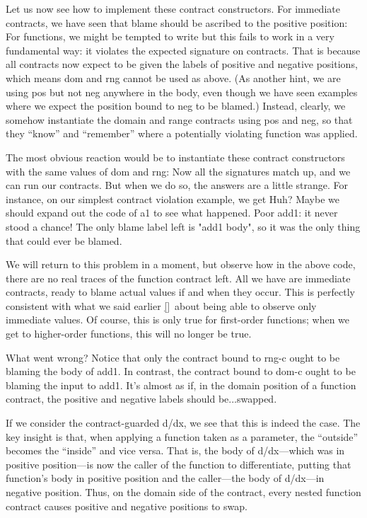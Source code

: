 Let us now see how to implement these contract constructors. For immediate
contracts, we have seen that blame should be ascribed to the positive position:
For functions, we might be tempted to write
but this fails to work in a very fundamental way: it violates the expected
signature on contracts. That is because all contracts now expect to be given the
labels of positive and negative positions, which means dom and rng cannot be
used as above. (As another hint, we are using pos but not neg anywhere in the
body, even though we have seen examples where we expect the position bound to
neg to be blamed.) Instead, clearly, we somehow instantiate the domain and range
contracts using pos and neg, so that they “know” and “remember” where a
potentially violating function was applied.

The most obvious reaction would be to instantiate these contract constructors
with the same values of dom and rng:
Now all the signatures match up, and we can run our contracts. But when we do
so, the answers are a little strange. For instance, on our simplest contract
violation example, we get
Huh? Maybe we should expand out the code of a1 to see what happened.
Poor add1: it never stood a chance! The only blame label left is "add1 body", so
it was the only thing that could ever be blamed.

We will return to this problem in a moment, but observe how in the above code,
there are no real traces of the function contract left. All we have are
immediate contracts, ready to blame actual values if and when they occur. This
is perfectly consistent with what we said earlier \ref{}\ about being able to
observe only immediate values. Of course, this is only true for first-order
functions; when we get to higher-order functions, this will no longer be true.

What went wrong? Notice that only the contract bound to rng-c ought to be
blaming the body of add1. In contrast, the contract bound to dom-c ought to be
blaming the input to add1. It’s almost as if, in the domain position of a
function contract, the positive and negative labels should be...swapped.

If we consider the contract-guarded d/dx, we see that this is indeed the case.
The key insight is that, when applying a function taken as a parameter, the
“outside” becomes the “inside” and vice versa. That is, the body of d/dx—which
was in positive position—is now the caller of the function to differentiate,
putting that function’s body in positive position and the caller—the body of
d/dx—in negative position. Thus, on the domain side of the contract, every
nested function contract causes positive and negative positions to swap.

